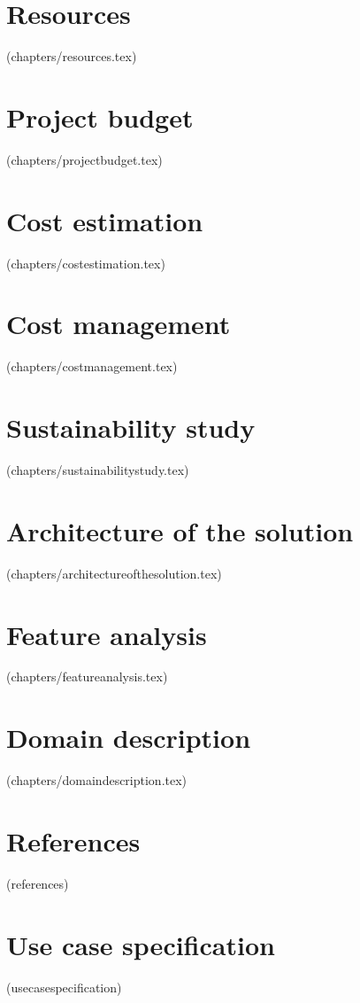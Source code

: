 \documentclass{report}
\begin{document}
        \chapter{Resources}
        (chapters/resources.tex)
        
        \chapter{Project budget}
        (chapters/projectbudget.tex)
        
        \chapter{Cost estimation}
        (chapters/costestimation.tex)
        
        \chapter{Cost management}
        (chapters/costmanagement.tex)
        
        \chapter{Sustainability study}
        (chapters/sustainabilitystudy.tex)
        
        \chapter{Architecture of the solution}
        (chapters/architectureofthesolution.tex)
        
        \chapter{Feature analysis}
        (chapters/featureanalysis.tex)
        
        \chapter{Domain description}
        (chapters/domaindescription.tex)

    \backmatter
        \chapter{References}
        (references)

        \appendix
            \chapter{Use case specification}
            (usecasespecification)
\end{document}
